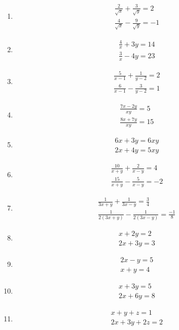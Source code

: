 \begin{enumerate}[label=\thesubsection.\arabic*,ref=\thesubsection.\theenumi]
\item
\begin{align}
\frac{2}{\sqrt{x}}+\frac{3}{\sqrt{y}}=2\\
\frac{4}{\sqrt{x}}-\frac{9}{\sqrt{y}}=-1
\end{align}
\item
\begin{align}
\frac{4}{x}+3y=14\\ \frac{3}{x}-4y=23
\end{align}
\item
\begin{align}
\frac{5}{x-1}+\frac{1}{y-2}=2\\ \frac{6}{x-1}-\frac{3}{y-2}=1
\end{align}
\item
\begin{align}
\frac{7x-2y}{xy}=5\\ \frac{8x+7y}{xy}=15
\end{align}
\item
\begin{align}
6x+3y=6xy\\ 2x+4y=5xy
\end{align}
\item
\begin{align}
\frac{10}{x+y}+\frac{2}{x-y}=4\\ \frac{15}{x+y}-\frac{5}{x-y}=-2
\end{align}
\item
\begin{align}
\frac{1}{3x+y}+\frac{1}{3x-y}=\frac{3}{4}\\ \frac{1}{2(3x+y)}-\frac{1}{2(3x-y)}=\frac{-1}{8}
\end{align}
\item  
\begin{align}
 x+2y = 2\\
2x+3y = 3
\end{align}
\item
\begin{align}
 2x-y = 5\\
 x+y = 4
\end{align}
\item
\begin{align}
 x+3y = 5\\
 2x+6y= 8
\end{align}
\item
\begin{align}
 x+y+z = 1\\
 2x+3y+2z = 2\\

\end{align}
\end{enumerate}
